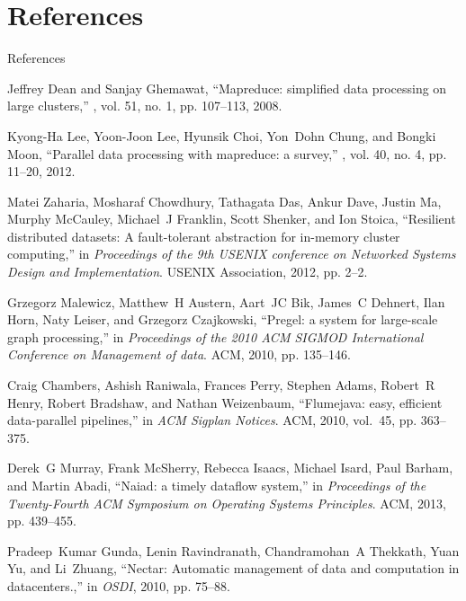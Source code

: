 \documentclass{beamer}
\begin{document}

\section{References}

\begin{frame}[allowframebreaks]{References}
\footnotesize{
\begin{thebibliography}{1}

Jeffrey Dean and Sanjay Ghemawat,
\newblock ``Mapreduce: simplified data processing on large clusters,''
, vol. 51, no. 1, pp. 107--113, 2008.

Kyong-Ha Lee, Yoon-Joon Lee, Hyunsik Choi, Yon~Dohn Chung, and Bongki Moon,
\newblock ``Parallel data processing with mapreduce: a survey,''
, vol. 40, no. 4, pp. 11--20, 2012.

Matei Zaharia, Mosharaf Chowdhury, Tathagata Das, Ankur Dave, Justin Ma, Murphy
  McCauley, Michael~J Franklin, Scott Shenker, and Ion Stoica,
\newblock ``Resilient distributed datasets: A fault-tolerant abstraction for
  in-memory cluster computing,''
\newblock in {\em Proceedings of the 9th USENIX conference on Networked Systems
  Design and Implementation}. USENIX Association, 2012, pp. 2--2.

Grzegorz Malewicz, Matthew~H Austern, Aart~JC Bik, James~C Dehnert, Ilan Horn,
  Naty Leiser, and Grzegorz Czajkowski,
\newblock ``Pregel: a system for large-scale graph processing,''
\newblock in {\em Proceedings of the 2010 ACM SIGMOD International Conference
  on Management of data}. ACM, 2010, pp. 135--146.

Craig Chambers, Ashish Raniwala, Frances Perry, Stephen Adams, Robert~R Henry,
  Robert Bradshaw, and Nathan Weizenbaum,
\newblock ``Flumejava: easy, efficient data-parallel pipelines,''
\newblock in {\em ACM Sigplan Notices}. ACM, 2010, vol.~45, pp. 363--375.

Derek~G Murray, Frank McSherry, Rebecca Isaacs, Michael Isard, Paul Barham, and
  Martin Abadi,
\newblock ``Naiad: a timely dataflow system,''
\newblock in {\em Proceedings of the Twenty-Fourth ACM Symposium on Operating
  Systems Principles}. ACM, 2013, pp. 439--455.

Pradeep~Kumar Gunda, Lenin Ravindranath, Chandramohan~A Thekkath, Yuan Yu, and
  Li~Zhuang,
\newblock ``Nectar: Automatic management of data and computation in
  datacenters.,''
\newblock in {\em OSDI}, 2010, pp. 75--88.


\end{thebibliography}
}
\end{frame}
\end{document}
